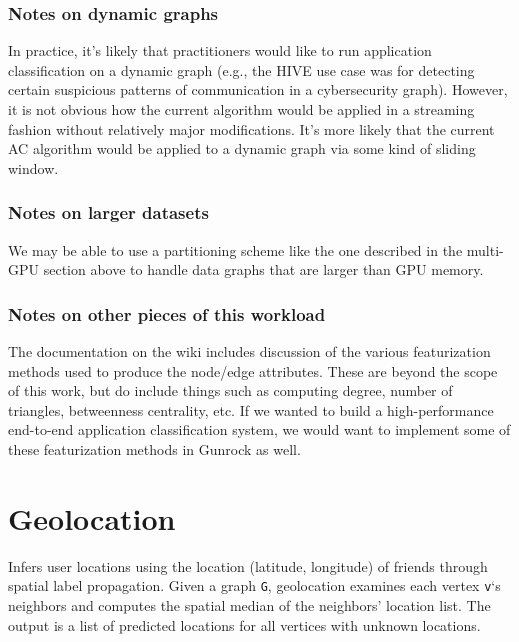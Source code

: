 \documentclass[10pt,oneside]{memoir}
\begin{document}
\hypertarget{notes-on-dynamic-graphs}{%
\subsection{Notes on dynamic graphs}\label{notes-on-dynamic-graphs}}

In practice, it's likely that practitioners would like to run
application classification on a dynamic graph (e.g., the HIVE use case
was for detecting certain suspicious patterns of communication in a
cybersecurity graph). However, it is not obvious how the current
algorithm would be applied in a streaming fashion without relatively
major modifications. It's more likely that the current AC algorithm
would be applied to a dynamic graph via some kind of sliding window.

\hypertarget{notes-on-larger-datasets}{%
\subsection{Notes on larger datasets}\label{notes-on-larger-datasets}}

We may be able to use a partitioning scheme like the one described in
the multi-GPU section above to handle data graphs that are larger than
GPU memory.

\hypertarget{notes-on-other-pieces-of-this-workload}{%
\subsection{Notes on other pieces of this
workload}\label{notes-on-other-pieces-of-this-workload}}

The documentation on the wiki includes discussion of the various
featurization methods used to produce the node/edge attributes. These
are beyond the scope of this work, but do include things such as
computing degree, number of triangles, betweenness centrality, etc. If
we wanted to build a high-performance end-to-end application
classification system, we would want to implement some of these
featurization methods in Gunrock as well.

\hypertarget{geolocation-1}{%
\chapter{Geolocation}\label{geolocation-1}}

Infers user locations using the location (latitude, longitude) of
friends through spatial label propagation. Given a graph \texttt{G},
geolocation examines each vertex \texttt{v}`s neighbors and computes the
spatial median of the neighbors' location list. The output is a list of
predicted locations for all vertices with unknown locations.
\end{document}
